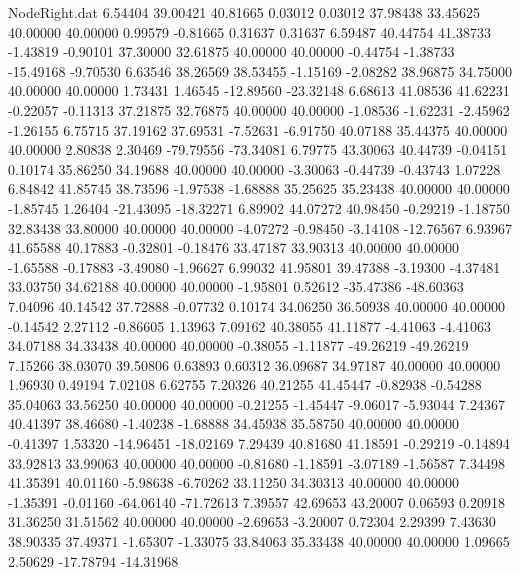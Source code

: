 \begin{filecontents}{NodeRight.dat}
   6.54404   39.00421   40.81665     0.03012    0.03012   37.98438   33.45625   40.00000   40.00000    0.99579   -0.81665    0.31637    0.31637
   6.59487   40.44754   41.38733    -1.43819   -0.90101   37.30000   32.61875   40.00000   40.00000   -0.44754   -1.38733  -15.49168   -9.70530
   6.63546   38.26569   38.53455    -1.15169   -2.08282   38.96875   34.75000   40.00000   40.00000    1.73431    1.46545  -12.89560  -23.32148
   6.68613   41.08536   41.62231    -0.22057   -0.11313   37.21875   32.76875   40.00000   40.00000   -1.08536   -1.62231   -2.45962   -1.26155
   6.75715   37.19162   37.69531    -7.52631   -6.91750   40.07188   35.44375   40.00000   40.00000    2.80838    2.30469  -79.79556  -73.34081
   6.79775   43.30063   40.44739    -0.04151    0.10174   35.86250   34.19688   40.00000   40.00000   -3.30063   -0.44739   -0.43743    1.07228
   6.84842   41.85745   38.73596    -1.97538   -1.68888   35.25625   35.23438   40.00000   40.00000   -1.85745    1.26404  -21.43095  -18.32271
   6.89902   44.07272   40.98450    -0.29219   -1.18750   32.83438   33.80000   40.00000   40.00000   -4.07272   -0.98450   -3.14108  -12.76567
   6.93967   41.65588   40.17883    -0.32801   -0.18476   33.47187   33.90313   40.00000   40.00000   -1.65588   -0.17883   -3.49080   -1.96627
   6.99032   41.95801   39.47388    -3.19300   -4.37481   33.03750   34.62188   40.00000   40.00000   -1.95801    0.52612  -35.47386  -48.60363
   7.04096   40.14542   37.72888    -0.07732    0.10174   34.06250   36.50938   40.00000   40.00000   -0.14542    2.27112   -0.86605    1.13963
   7.09162   40.38055   41.11877    -4.41063   -4.41063   34.07188   34.33438   40.00000   40.00000   -0.38055   -1.11877  -49.26219  -49.26219
   7.15266   38.03070   39.50806     0.63893    0.60312   36.09687   34.97187   40.00000   40.00000    1.96930    0.49194    7.02108    6.62755
   7.20326   40.21255   41.45447    -0.82938   -0.54288   35.04063   33.56250   40.00000   40.00000   -0.21255   -1.45447   -9.06017   -5.93044
   7.24367   40.41397   38.46680    -1.40238   -1.68888   34.45938   35.58750   40.00000   40.00000   -0.41397    1.53320  -14.96451  -18.02169
   7.29439   40.81680   41.18591    -0.29219   -0.14894   33.92813   33.99063   40.00000   40.00000   -0.81680   -1.18591   -3.07189   -1.56587
   7.34498   41.35391   40.01160    -5.98638   -6.70262   33.11250   34.30313   40.00000   40.00000   -1.35391   -0.01160  -64.06140  -71.72613
   7.39557   42.69653   43.20007     0.06593    0.20918   31.36250   31.51562   40.00000   40.00000   -2.69653   -3.20007    0.72304    2.29399
   7.43630   38.90335   37.49371    -1.65307   -1.33075   33.84063   35.33438   40.00000   40.00000    1.09665    2.50629  -17.78794  -14.31968

\end{filecontents}
